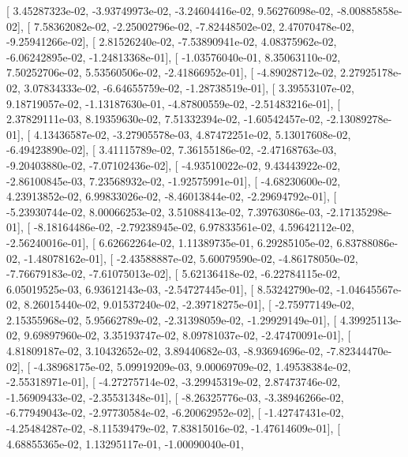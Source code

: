 \documentclass{article}
\begin{document}
       [  3.45287323e-02,  -3.93749973e-02,  -3.24604416e-02,
          9.56276098e-02,  -8.00885858e-02],
       [  7.58362082e-02,  -2.25002796e-02,  -7.82448502e-02,
          2.47070478e-02,  -9.25941266e-02],
       [  2.81526240e-02,  -7.53890941e-02,   4.08375962e-02,
         -6.06242895e-02,  -1.24813368e-01],
       [ -1.03576040e-01,   8.35063110e-02,   7.50252706e-02,
          5.53560506e-02,  -2.41866952e-01],
       [ -4.89028712e-02,   2.27925178e-02,   3.07834333e-02,
         -6.64655759e-02,  -1.28738519e-01],
       [  3.39553107e-02,   9.18719057e-02,  -1.13187630e-01,
         -4.87800559e-02,  -2.51483216e-01],
       [  2.37829111e-03,   8.19359630e-02,   7.51332394e-02,
         -1.60542457e-02,  -2.13089278e-01],
       [  4.13436587e-02,  -3.27905578e-03,   4.87472251e-02,
          5.13017608e-02,  -6.49423890e-02],
       [  3.41115789e-02,   7.36155186e-02,  -2.47168763e-03,
         -9.20403880e-02,  -7.07102436e-02],
       [ -4.93510022e-02,   9.43443922e-02,  -2.86100845e-03,
          7.23568932e-02,  -1.92575991e-01],
       [ -4.68230600e-02,   4.23913852e-02,   6.99833026e-02,
         -8.46013844e-02,  -2.29694792e-01],
       [ -5.23930744e-02,   8.00066253e-02,   3.51088413e-02,
          7.39763086e-03,  -2.17135298e-01],
       [ -8.18164486e-02,  -2.79238945e-02,   6.97833561e-02,
          4.59642112e-02,  -2.56240016e-01],
       [  6.62662264e-02,   1.11389735e-01,   6.29285105e-02,
          6.83788086e-02,  -1.48078162e-01],
       [ -2.43588887e-02,   5.60079590e-02,  -4.86178050e-02,
         -7.76679183e-02,  -7.61075013e-02],
       [  5.62136418e-02,  -6.22784115e-02,   6.05019525e-03,
          6.93612143e-03,  -2.54727445e-01],
       [  8.53242790e-02,  -1.04645567e-02,   8.26015440e-02,
          9.01537240e-02,  -2.39718275e-01],
       [ -2.75977149e-02,   2.15355968e-02,   5.95662789e-02,
         -2.31398059e-02,  -1.29929149e-01],
       [  4.39925113e-02,   9.69897960e-02,   3.35193747e-02,
          8.09781037e-02,  -2.47470091e-01],
       [  4.81809187e-02,   3.10432652e-02,   3.89440682e-03,
         -8.93694696e-02,  -7.82344470e-02],
       [ -4.38968175e-02,   5.09919209e-03,   9.00069709e-02,
          1.49538384e-02,  -2.55318971e-01],
       [ -4.27275714e-02,  -3.29945319e-02,   2.87473746e-02,
         -1.56909433e-02,  -2.35531348e-01],
       [ -8.26325776e-03,  -3.38946266e-02,  -6.77949043e-02,
         -2.97730584e-02,  -6.20062952e-02],
       [ -1.42747431e-02,  -4.25484287e-02,  -8.11539479e-02,
          7.83815016e-02,  -1.47614609e-01],
       [  4.68855365e-02,   1.13295117e-01,  -1.00090040e-01,
\end{document}
